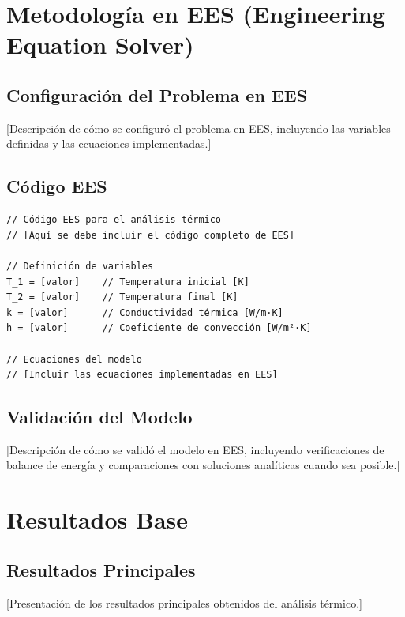 \documentclass[12pt,letterpaper]{article}
\begin{document}
\newpage
\section{Metodología en EES (Engineering Equation Solver)}

\subsection{Configuración del Problema en EES}
[Descripción de cómo se configuró el problema en EES, incluyendo las variables definidas y las ecuaciones implementadas.]

\subsection{Código EES}
\begin{verbatim}
// Código EES para el análisis térmico
// [Aquí se debe incluir el código completo de EES]

// Definición de variables
T_1 = [valor]    // Temperatura inicial [K]
T_2 = [valor]    // Temperatura final [K]
k = [valor]      // Conductividad térmica [W/m·K]
h = [valor]      // Coeficiente de convección [W/m²·K]

// Ecuaciones del modelo
// [Incluir las ecuaciones implementadas en EES]

\end{verbatim}

\subsection{Validación del Modelo}
[Descripción de cómo se validó el modelo en EES, incluyendo verificaciones de balance de energía y comparaciones con soluciones analíticas cuando sea posible.]

\newpage
\section{Resultados Base}

\subsection{Resultados Principales}
[Presentación de los resultados principales obtenidos del análisis térmico.]
\end{document}
